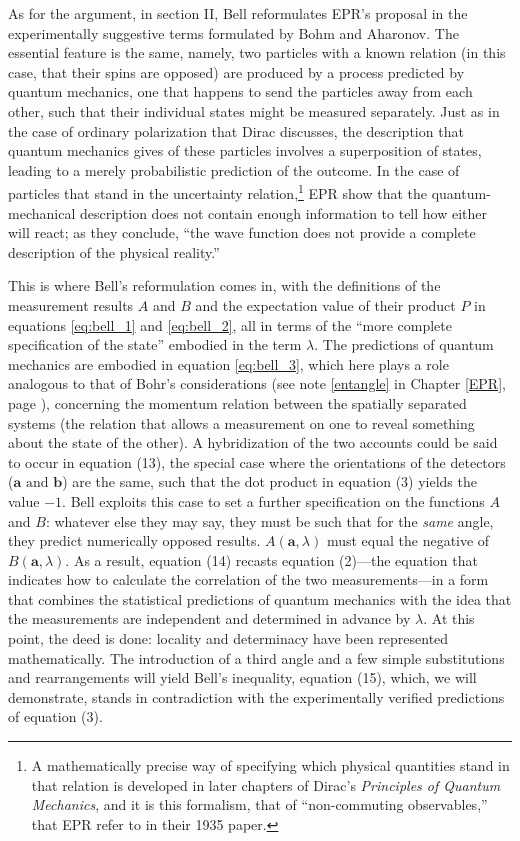 As for the argument, in section II, Bell reformulates EPR's proposal in the experimentally suggestive terms formulated by Bohm and Aharonov. The essential feature is the same, namely, two
particles with a known relation (in this case, that their spins are opposed) are produced 
by a process predicted by quantum mechanics, one that happens to send the particles away from 
each other, such that their individual states might be measured separately. Just as in the case
of ordinary polarization that Dirac discusses, the description that quantum mechanics gives of these particles involves a superposition of states, leading to a merely probabilistic prediction of the outcome. In the case of particles that stand in the uncertainty relation,\footnote{A mathematically precise way of specifying which physical quantities stand in that relation is developed in later chapters of Dirac's \emph{Principles of Quantum Mechanics}, and it is this formalism, that of ``non-commuting observables,'' that EPR refer to in their 1935 paper.} EPR show that the quantum-mechanical description does not contain enough information to tell how either will react; as they conclude, ``the wave function does not provide a complete description of the physical reality.''

This is where Bell's reformulation comes in, with the definitions of the measurement results $A$ and
$B$ and the expectation value of their product $P$ in equations \eqref{eq:bell_1} and \eqref{eq:bell_2}, all in terms of the ``more complete specification of the state'' embodied in the term $\lambda$. The predictions of quantum
mechanics are embodied in equation \eqref{eq:bell_3}, which here plays a role analogous to that of Bohr's 
considerations (see note \ref{entangle} in Chapter \ref{EPR}, page \pageref{entangle}), concerning the momentum relation between the spatially 
separated systems (the relation that allows a measurement on one to reveal something about the state
of the other). A hybridization of the two accounts could be said to occur in equation (13), 
the special case where the orientations of the detectors ($\pmb{a} \text{ and } \pmb{b}$) are the same,
such that the dot product in equation (3) yields the value $-1$. Bell exploits this case to set a
further specification on the functions $A$ and $B$: whatever else they may say, they must
be such that for the \emph{same} angle, they predict numerically opposed results. $A(\pmb{a},\lambda)$
must equal the negative of $B(\pmb{a},\lambda)$. As a result, equation (14) recasts equation (2)---the equation that indicates how to calculate the correlation of the two measurements---in a form that combines the statistical predictions of quantum mechanics with the idea that the measurements are independent and determined in
advance by $\lambda$. At this point, the deed is done: locality and determinacy have been represented mathematically. The introduction of a third angle and a few simple substitutions and rearrangements will yield Bell's inequality, equation (15), which, we will demonstrate, stands in contradiction with the experimentally verified predictions of equation (3).


